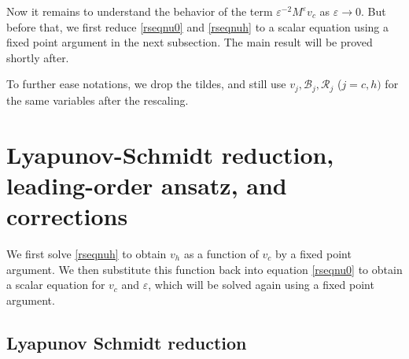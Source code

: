 \documentclass[10pt]{article}
\newcommand{\eps}{\varepsilon}
\newcommand{\B}{\mathcal{B}}
\newcommand{\Rm}{\mathcal{R}}
\begin{document}
Now it remains to understand the behavior of the term $\eps^{-2}M^\eps v_c$ as $\eps \to 0$. But before that, we first reduce \eqref{rseqnu0} and \eqref{rseqnuh} to a scalar equation using a fixed point argument in the next subsection. The main result will be proved shortly after.

To further ease notations, we drop the tildes, and still use $v_j,\B_j,\Rm_j$ ($j=c,h)$ for the same variables after the rescaling. 



\section{Lyapunov-Schmidt reduction, leading-order ansatz, and corrections}\label{s:3}
We first solve \eqref{rseqnuh} to obtain $v_h$ as a function of $v_c$ by a fixed point argument. We then substitute this function back into equation \eqref{rseqnu0} to obtain a scalar equation for $v_c$ and $\eps$, which will be solved again using a fixed point argument.

\subsection{Lyapunov Schmidt reduction}
\end{document}
